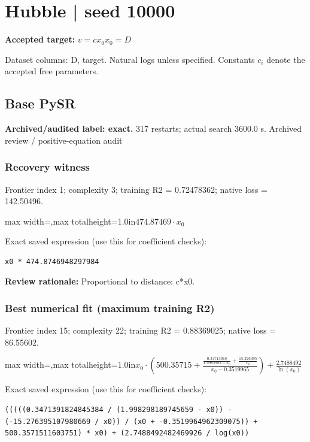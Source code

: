 \documentclass[10pt,letterpaper,landscape]{article}
\begin{document}
\section*{Hubble | seed 10000}
\textbf{Accepted target:} $\displaystyle v=c x_0$\hfill $x_0=D$\par
{\small Dataset columns: D, target. Natural logs unless specified. Constants $c_i$ denote the accepted free parameters.}\par\medskip
\begin{minipage}[t]{0.485\textwidth}
\subsection*{Base PySR}
\textbf{Archived/audited label: exact.} 317 restarts; actual search 3600.0 s.
{\small Archived review / positive-equation audit}
\subsubsection*{Recovery witness}
Frontier index 1; complexity 3; training R2 = 0.72478362; native loss = 142.50496.
\begin{center}\begin{adjustbox}{max width=\linewidth,max totalheight=1.0in}$\displaystyle 474.87469 \cdot x_{0}$\end{adjustbox}\end{center}
{\scriptsize Exact saved expression (use this for coefficient checks):}
\begin{lstlisting}
x0 * 474.8746948297984
\end{lstlisting}
{\small\textbf{Review rationale:} Proportional to distance: c*x0.}
\subsubsection*{Best numerical fit (maximum training R2)}
Frontier index 15; complexity 22; training R2 = 0.88369025; native loss = 86.55602.
\begin{center}\begin{adjustbox}{max width=\linewidth,max totalheight=1.0in}$\displaystyle x_{0} \cdot \left(500.35715 + \frac{\frac{0.34713918}{1.9982982 - x_{0}} + \frac{15.276395}{x_{0}}}{x_{0} - 0.3519965}\right) + \frac{2.7488492}{\ln{\left(x_{0} \right)}}$\end{adjustbox}\end{center}
{\scriptsize Exact saved expression (use this for coefficient checks):}
\begin{lstlisting}
(((((0.3471391824845384 / (1.998298189745659 - x0)) - (-15.276395107980669 / x0)) / (x0 + -0.3519964962309075)) + 500.3571511603751) * x0) + (2.7488492482469926 / log(x0))
\end{lstlisting}
\end{minipage}\hfill
\end{document}
